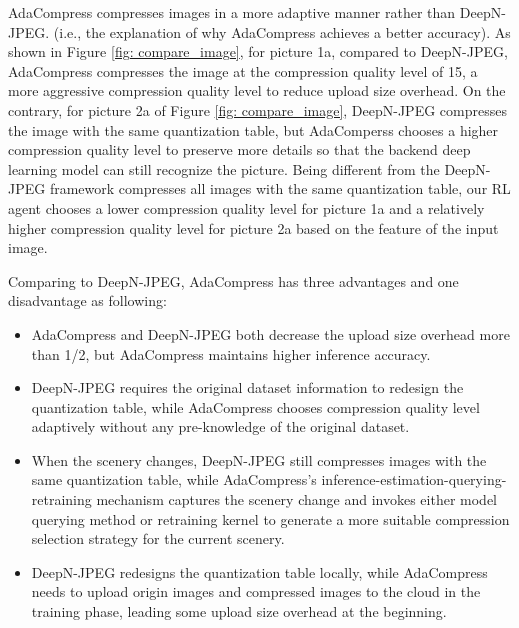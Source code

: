 AdaCompress compresses images in a more adaptive manner rather than DeepN-JPEG. (i.e., the explanation of why AdaCompress achieves a better accuracy). As shown in Figure \ref{fig: compare_image}, for picture 1a, compared to DeepN-JPEG, AdaCompress compresses the image at the compression quality level of 15, a more aggressive compression quality level to reduce upload size overhead. On the contrary, for picture 2a of Figure \ref{fig: compare_image}, DeepN-JPEG compresses the image with the same quantization table, but AdaComperss chooses a higher compression quality level to preserve more details so that the backend deep learning model can still recognize the picture. Being different from the DeepN-JPEG framework compresses all images with the same quantization table, our RL agent chooses a lower compression quality level for picture 1a and a relatively higher compression quality level for picture 2a based on the feature of the input image. 


Comparing to DeepN-JPEG, AdaCompress has three advantages and one disadvantage as following: %
    \begin{itemize}
        \item AdaCompress and DeepN-JPEG both decrease the upload size overhead more than 1/2, but AdaCompress maintains higher inference accuracy.
        \item DeepN-JPEG requires the original dataset information to redesign the quantization table, while AdaCompress chooses compression quality level adaptively without any pre-knowledge of the original dataset. 
        \item When the scenery changes, DeepN-JPEG still compresses images with the same quantization table, while AdaCompress's inference-estimation-querying-retraining mechanism captures the scenery change and invokes either model querying method or retraining kernel to generate a more suitable compression selection strategy for the current scenery.
        \item DeepN-JPEG redesigns the quantization table locally, while AdaCompress needs to upload origin images and compressed images to the cloud in the training phase, leading some upload size overhead at the beginning. 
    \end{itemize}

